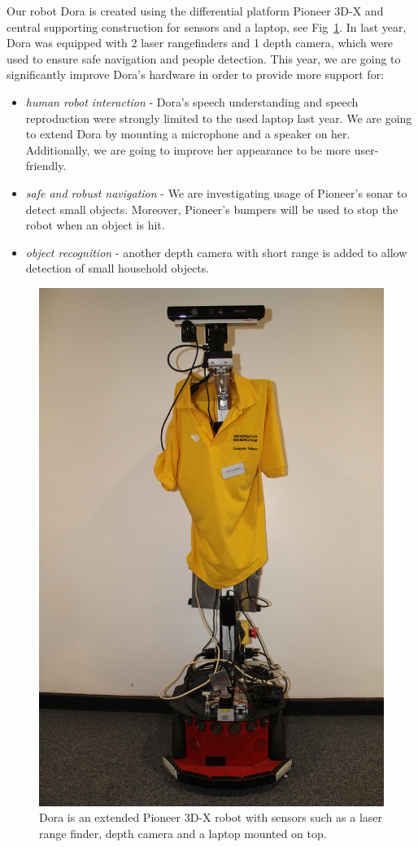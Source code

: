 Our robot Dora is created using the differential platform Pioneer 3D-X and central supporting construction for sensors and a laptop, see Fig~\ref{fig:dora}. 
In last year, Dora was equipped with 2 laser rangefinders and 1 depth camera, which were used to ensure safe navigation 
and people detection. 
This year, we are going to significantly improve Dora's hardware in order to provide more support for:
\begin{itemize}
\item \textit{human robot interaction} - Dora's speech understanding and speech reproduction were strongly limited to the used laptop last year. 
We are going to extend Dora by mounting a microphone and a speaker on her. Additionally, we are going to improve her appearance to be more user-friendly. 
\item \textit{safe and robust navigation} - We are investigating usage of Pioneer's sonar to detect small objects. 
Moreover, Pioneer's bumpers will be used to stop the robot when an object is hit. 
\item \textit{object recognition} - another depth camera with short range is added to allow detection of small household objects.
\end{itemize}
 
\begin{figure}[!htb]
\centering
\includegraphics[width=2.in]{dora_new.png}
\caption{Dora is an extended Pioneer 3D-X robot with sensors such as a laser range finder, depth camera and a laptop mounted on top.}
\label{fig:dora}
\end{figure}  



